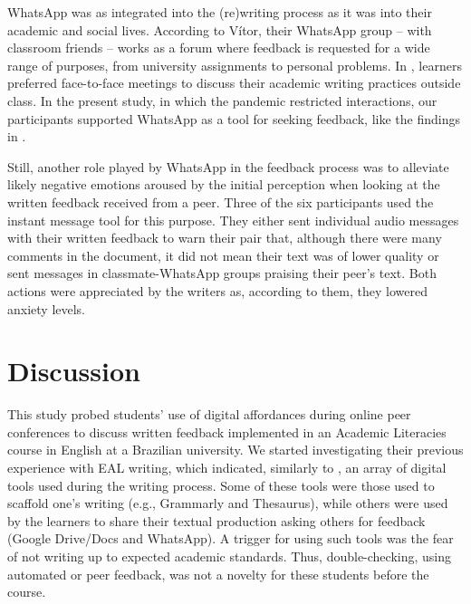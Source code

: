 \documentclass[english]{textolivre}
\begin{document}
WhatsApp was as integrated into the (re)writing process as it was into their academic and social lives. According to Vítor, their WhatsApp group – with classroom friends – works as a forum where feedback is requested for a wide range of purposes, from university assignments to personal problems. In \textcite{bankier2022socialization}, learners preferred face-to-face meetings to discuss their academic writing practices outside class. In the present study, in which the pandemic restricted interactions, our participants supported WhatsApp as a tool for seeking feedback, like the findings in \textcite{umamah2022efl}.

Still, another role played by WhatsApp in the feedback process was to alleviate likely negative emotions aroused by the initial perception when looking at the written feedback received from a peer. Three of the six participants used the instant message tool for this purpose. They either sent individual audio messages with their written feedback to warn their pair that, although there were many comments in the document, it did not mean their text was of lower quality or sent messages in classmate-WhatsApp groups praising their peer’s text. Both actions were appreciated by the writers as, according to them, they lowered anxiety levels.

\section{Discussion}

This study probed students' use of digital affordances during online peer conferences to discuss written feedback implemented in an Academic Literacies course in English at a Brazilian university. We started investigating their previous experience with EAL writing, which indicated, similarly to \textcite{umamah2022efl}, an array of digital tools used during the writing process. Some of these tools were those used to scaffold one's writing (e.g., Grammarly and Thesaurus), while others were used by the learners to share their textual production asking others for feedback (Google Drive/Docs and WhatsApp). A trigger for using such tools was the fear of not writing up to expected academic standards. Thus, double-checking, using automated or peer feedback, was not a novelty for these students before the course.
\end{document}
